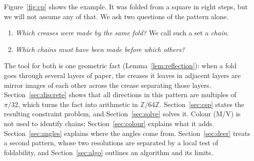 \documentclass[11pt]{article}
\theoremstyle{definition}
\theoremstyle{remark}
\newcommand{\Z}{\mathbb{Z}}
\newcommand{\ZN}{\Z/64\Z}
\begin{document}
Figure~\ref{fig:cp} shows the example. It was folded from a square in eight steps, but we will not assume any of that. We ask two questions of the pattern alone.
\begin{enumerate}
\item[(Q1)] \emph{Which creases were made by the same fold?} We call such a set a \emph{chain}.
\item[(Q2)] \emph{Which chains must have been made before which others?}
\end{enumerate}
The tool for both is one geometric fact (Lemma~\ref{lem:reflection}): when a fold goes through several layers of paper, the creases it leaves in adjacent layers are mirror images of each other across the crease separating those layers. Section~\ref{sec:discrete} shows that all directions in this pattern are multiples of $\pi/32$, which turns the fact into arithmetic in $\ZN$. Section~\ref{sec:csp} states the resulting constraint problem, and Section~\ref{sec:solve} solves it. Colour (M/V) is not used to identify chains; Section~\ref{sec:colour} explains what it adds. Section~\ref{sec:angles} explains where the angles come from. Section~\ref{sec:deer} treats a second pattern, whose two resolutions are separated by a local test of foldability, and Section~\ref{sec:algo} outlines an algorithm and its limits.
\end{document}
